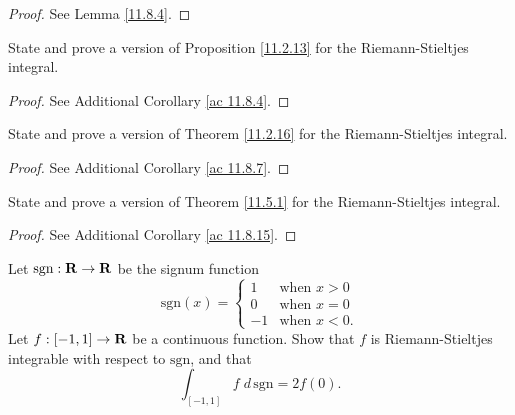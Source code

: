 \begin{proof}
    See Lemma \ref{11.8.4}.
\end{proof}

\begin{exercise}\label{ex 11.8.2}
    State and prove a version of Proposition \ref{11.2.13} for the Riemann-Stieltjes integral.
\end{exercise}

\begin{proof}
    See Additional Corollary \ref{ac 11.8.4}.
\end{proof}

\begin{exercise}\label{ex 11.8.3}
    State and prove a version of Theorem \ref{11.2.16} for the Riemann-Stieltjes integral.
\end{exercise}

\begin{proof}
    See Additional Corollary \ref{ac 11.8.7}.
\end{proof}

\begin{exercise}\label{ex 11.8.4}
    State and prove a version of Theorem \ref{11.5.1} for the Riemann-Stieltjes integral.
\end{exercise}

\begin{proof}
    See Additional Corollary \ref{ac 11.8.15}.
\end{proof}

\begin{exercise}\label{ex 11.8.5}
    Let \(\text{sgn} : \mathbf{R} \to \mathbf{R}\) be the signum function
    \[
        \text{sgn}(x) = \begin{cases}
            1  & \text{when } x > 0  \\
            0  & \text{when } x = 0  \\
            -1 & \text{when } x < 0.
        \end{cases}
    \]
    Let \(f : [-1, 1] \to \mathbf{R}\) be a continuous function.
    Show that \(f\) is Riemann-Stieltjes integrable with respect to \(\text{sgn}\), and that
    \[
        \int_{[-1, 1]} f \; d \, \text{sgn} = 2f(0).
    \]
\end{exercise}

